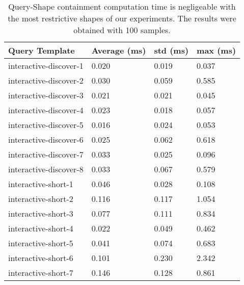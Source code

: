 \begin{table}
	\begin{center}
		\begin{tabular}{|l|l|l|l|}
			\hline
			Query Template & Average (ms) & std (ms) & max (ms) \\
			\hline
			interactive-discover-1 & 0.020 & 0.019 & 0.037 \\
			\hline
			interactive-discover-2 & 0.030 & 0.059 & 0.585 \\
			\hline
			interactive-discover-3 & 0.021 & 0.021 & 0.045 \\
			\hline
			interactive-discover-4 & 0.023 & 0.018 & 0.057 \\
			\hline
			interactive-discover-5 & 0.016 & 0.024 & 0.053 \\
			\hline
			interactive-discover-6 & 0.025 & 0.062 & 0.618 \\
			\hline
			interactive-discover-7 & 0.033 & 0.025 & 0.096 \\
			\hline
			interactive-discover-8 & 0.033 & 0.067 & 0.579 \\
			\hline
			interactive-short-1 & 0.046 & 0.028 & 0.108 \\
			\hline
			interactive-short-2 & 0.116 & 0.117 & 1.054 \\
			\hline
			interactive-short-3 & 0.077 & 0.111 & 0.834 \\
			\hline
			interactive-short-4 & 0.022 & 0.049 & 0.462 \\
			\hline
			interactive-short-5 & 0.041 & 0.074 & 0.683 \\
			\hline
			interactive-short-6 & 0.101 & 0.230 & 2.342 \\
			\hline
			interactive-short-7 & 0.146 & 0.128 & 0.861 \\
			\hline
		\end{tabular}
	\end{center}
	\caption{Query-Shape containment computation time is negligeable with the most restrictive shapes of our experiments. The results were obtained with 100 samples.}
	\label{tab:queryShapeContainmentEval}
\end{table}